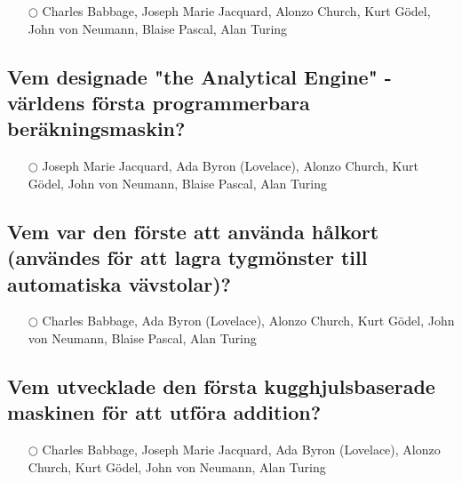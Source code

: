 \documentclass[a4paper,11pt,oneside]{article}
\begin{document}
\begin{sloppypar}
\label{q:434:mc:sv:True}

\begin{itemize}
  \item[$\bigcirc$] Charles Babbage, Joseph Marie Jacquard, Alonzo Church, Kurt G\"odel, John von Neumann, Blaise Pascal, Alan Turing
\end{itemize}



\subsection{Vem designade "the Analytical Engine" - v\"arldens f\"orsta programmerbara ber\"akningsmaskin?}

\label{q:435:mc:sv:True}

\begin{itemize}
  \item[$\bigcirc$] Joseph Marie Jacquard, Ada Byron (Lovelace), Alonzo Church, Kurt G\"odel, John von Neumann, Blaise Pascal, Alan Turing
\end{itemize}



\subsection{Vem var den f\"orste att anv\"anda h\r{a}lkort (anv\"andes f\"or att lagra tygm\"onster till automatiska v\"avstolar)?}

\label{q:436:mc:sv:True}

\begin{itemize}
  \item[$\bigcirc$] Charles Babbage, Ada Byron (Lovelace), Alonzo Church, Kurt G\"odel, John von Neumann, Blaise Pascal, Alan Turing
\end{itemize}



\subsection{Vem utvecklade den f\"orsta kugghjulsbaserade maskinen f\"or att utf\"ora addition?}

\label{q:437:mc:sv:True}

\begin{itemize}
  \item[$\bigcirc$] Charles Babbage, Joseph Marie Jacquard, Ada Byron (Lovelace), Alonzo Church, Kurt G\"odel, John von Neumann, Alan Turing
\end{itemize}




\end{sloppypar}
\end{document}
